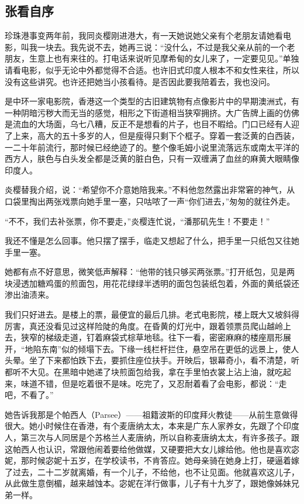 \subsection{张看自序}


\par 珍珠港事变两年前，我同炎樱刚进港大，有一天她说她父亲有个老朋友请她看电影，叫我一块去。我先说不去，她再三说：“没什么，不过是我父亲从前的一个老朋友，生意上也有来往的。打电话来说听见摩希甸的女儿来了，一定要见见。”单独请看电影，似乎无论中外都觉得不合适。也许旧式印度人根本不和女性来往，所以没有这些讲究。也许还把她当小孩看待。是否因此要我陪着去，我也没问。
\par 是中环一家电影院，香港这一个类型的古旧建筑物有点像影片中的早期澳洲式，有一种阴暗污秽大而无当的感觉，相形之下街道相当狭窄拥挤。大广告牌上画的仿佛是流血的大场面，乌七八糟，反正不是想看的片子，也目不暇给。门口已经有人迎了上来，高大的五十多岁的人，但是瘦得只剩下个框子。穿着一套泛黄的白西装，一二十年前流行，那时候已经绝迹了的。整个像毛姆小说里流落远东或南太平洋的西方人，肤色与白头发全都是泛黄的脏白色，只有一双缠满了血丝的麻黄大眼睛像印度人。
\par 炎樱替我介绍，说：“希望你不介意她陪我来。”不料他忽然露出非常窘的神气，从口袋里掏出两张戏票向她手里一塞，只咕哝了一声“你们进去，”匆匆的就往外走。
\par “不不，我们去补张票，你不要走，”炎樱连忙说，“潘那矶先生！不要走！”
\par 我还不懂是怎么回事。他只摆了摆手，临走又想起了什么，把手里一只纸包又往她手里一塞。
\par 她都有点不好意思，微笑低声解释：“他带的钱只够买两张票。”打开纸包，见是两块浸透加糖鸡蛋的煎面包，用花花绿绿半透明的面包包装纸包着，外面的黄纸袋还渗出油渍来。
\par 我们只好进去。是楼上的票，最便宜的最后几排。老式电影院，楼上既大又坡斜得厉害，真还没看见过这样险陡的角度。在昏黄的灯光中，跟着领票员爬山越岭上去，狭窄的梯级走道，钉着麻袋式棕草地毯。往下一看，密密麻麻的楼座扇形展开，“地陷东南”似的倾塌下去。下缘一线栏杆拦住，悬空吊在更低的远景上，使人头晕。坐了下来都怕跌下去，要抓住座位扶手。开映后，银幕奇小，看不清楚，听都听不大见。在黑暗中她递了块煎面包给我，拿在手里怕衣裳上沾上油，就吃起来，味道不错，但是吃着很不是味。吃完了，又忍耐着看了会电影，都说：“走吧，不看了。”
\par 她告诉我那是个帕西人（Parsee）——祖籍波斯的印度拜火教徒——从前生意做得很大。她小时候住在香港，有个麦唐纳太太，本来是广东人家养女，先跟了个印度人，第三次与人同居是个苏格兰人麦唐纳，所以自称麦唐纳太太，有许多孩子。跟这帕西人也认识，常跟他闹着要给他做媒，又硬要把大女儿嫁给他。他也是喜欢宓妮，那时候宓妮十五岁，在学校读书，不肯答应。她母亲骑在她身上打，硬逼着嫁了过去，二十二岁就离婚，有一个儿子，不给他，也不让见面。他就喜欢这儿子，从此做生意倒楣，越来越蚀本。宓妮在洋行做事，儿子有十九岁了，跟她像姊妹兄弟一样。
